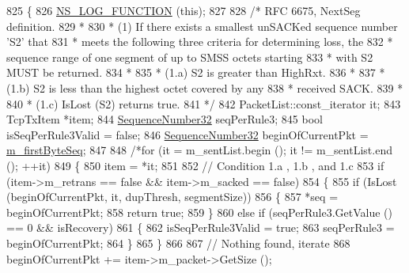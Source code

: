 \begin{DoxyCode}
825 \{
826   \hyperlink{log-macros-disabled_8h_a90b90d5bad1f39cb1b64923ea94c0761}{NS\_LOG\_FUNCTION} (\textcolor{keyword}{this});
827 
828   \textcolor{comment}{/* RFC 6675, NextSeg definition.}
829 \textcolor{comment}{   *}
830 \textcolor{comment}{   * (1) If there exists a smallest unSACKed sequence number 'S2' that}
831 \textcolor{comment}{   *     meets the following three criteria for determining loss, the}
832 \textcolor{comment}{   *     sequence range of one segment of up to SMSS octets starting}
833 \textcolor{comment}{   *     with S2 MUST be returned.}
834 \textcolor{comment}{   *}
835 \textcolor{comment}{   *     (1.a) S2 is greater than HighRxt.}
836 \textcolor{comment}{   *}
837 \textcolor{comment}{   *     (1.b) S2 is less than the highest octet covered by any}
838 \textcolor{comment}{   *           received SACK.}
839 \textcolor{comment}{   *}
840 \textcolor{comment}{   *     (1.c) IsLost (S2) returns true.}
841 \textcolor{comment}{   */}
842   PacketList::const\_iterator it;
843   TcpTxItem *item;
844   \hyperlink{group__network_gacb2070e4e98d2d5135c9bede58f07a03}{SequenceNumber32} seqPerRule3;
845   \textcolor{keywordtype}{bool} isSeqPerRule3Valid = \textcolor{keyword}{false};
846   \hyperlink{group__network_gacb2070e4e98d2d5135c9bede58f07a03}{SequenceNumber32} beginOfCurrentPkt = \hyperlink{classns3_1_1TcpTxBuffer_a46b67e5cb3396b43a41dd3fd5b135346}{m\_firstByteSeq};
847 
848   \textcolor{comment}{/*for (it = m\_sentList.begin (); it != m\_sentList.end (); ++it)}
849 \textcolor{comment}{    \{}
850 \textcolor{comment}{      item = *it;}
851 \textcolor{comment}{}
852 \textcolor{comment}{      // Condition 1.a , 1.b , and 1.c}
853 \textcolor{comment}{      if (item->m\_retrans == false && item->m\_sacked == false)}
854 \textcolor{comment}{        \{}
855 \textcolor{comment}{          if (IsLost (beginOfCurrentPkt, it, dupThresh, segmentSize))}
856 \textcolor{comment}{            \{}
857 \textcolor{comment}{              *seq = beginOfCurrentPkt;}
858 \textcolor{comment}{              return true;}
859 \textcolor{comment}{            \}}
860 \textcolor{comment}{          else if (seqPerRule3.GetValue () == 0 && isRecovery)}
861 \textcolor{comment}{            \{}
862 \textcolor{comment}{              isSeqPerRule3Valid = true;}
863 \textcolor{comment}{              seqPerRule3 = beginOfCurrentPkt;}
864 \textcolor{comment}{            \}}
865 \textcolor{comment}{        \}}
866 \textcolor{comment}{}
867 \textcolor{comment}{      // Nothing found, iterate}
868 \textcolor{comment}{      beginOfCurrentPkt += item->m\_packet->GetSize ();}

\end{DoxyCode}

